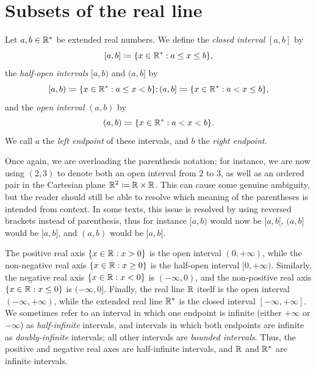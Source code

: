 \section{Subsets of the real line}\label{i:sec:9.1}

\begin{defn}[Intervals]\label{i:9.1.1}
  Let \(a, b \in \mathbb{R}^*\) be extended real numbers.
  We define the \emph{closed interval} \([a, b]\) by
  \[
    [a, b] \coloneqq \set{x \in \R^* : a \leq x \leq b},
  \]
  the \emph{half-open intervals} \([a, b)\) and \((a, b]\) by
  \[
    [a, b) \coloneqq \set{x \in \R^* : a \leq x < b}; (a, b] \coloneqq \set{x \in \R^* : a < x \leq b},
  \]
  and the \emph{open interval} \((a, b)\) by
  \[
    (a, b) \coloneqq \set{x \in \R^* : a < x < b}.
  \]
  We call \(a\) the \emph{left endpoint} of these intervals, and \(b\) the \emph{right endpoint}.
\end{defn}

\begin{rmk}\label{i:9.1.2}
  Once again, we are overloading the parenthesis notation;
  for instance, we are now using \((2, 3)\) to denote both an open interval from \(2\) to \(3\), as well as an ordered pair in the Cartesian plane \(\mathbb{R}^2 \coloneqq \mathbb{R} \times \mathbb{R}\).
  This can cause some genuine ambiguity, but the reader should still be able to resolve which meaning of the parentheses is intended from context.
  In some texts, this issue is resolved by using reversed brackets instead of parenthesis, thus for instance \([a, b)\) would now be \([a, b[\), \((a, b]\) would be \(]a, b]\), and \((a, b)\) would be \(]a, b[\).
\end{rmk}

\begin{eg}\label{i:9.1.3}
  The positive real axis \(\left\lbrace x \in \mathbb{R} : x > 0\right\rbrace\) is the open interval \((0, +\infty)\), while the non-negative real axis \(\left\lbrace x \in \mathbb{R} : x \geq 0\right\rbrace\) is the half-open interval \([0, +\infty)\).
      Similarly, the negative real axis \(\left\lbrace x \in \mathbb{R} : x < 0\right\rbrace\) is \((-\infty, 0)\), and the non-positive real axis \(\left\lbrace x \in \mathbb{R} : x \leq 0\right\rbrace\) is \((-\infty, 0]\).
  Finally, the real line \(\mathbb{R}\) itself is the open interval \((-\infty, +\infty)\), while the extended real line \(\mathbb{R}^*\) is the closed interval \([-\infty, +\infty]\).
  We sometimes refer to an interval in which one endpoint is infinite (either \(+\infty\) or \(-\infty\)) as \emph{half-infinite} intervals, and intervals in which both endpoints are infinite as \emph{doubly-infinite} intervals;
  all other intervals are \emph{bounded intervals}.
  Thus, the positive and negative real axes are half-infinite intervals, and \(\mathbb{R}\) and \(\mathbb{R}^*\) are infinite intervals.
\end{eg}

